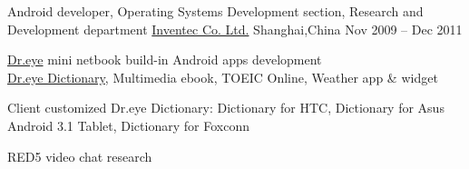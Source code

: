 \begin{cventries}
	\cventry
	{Android developer, Operating Systems Development section, Research and Development department}
	{\href{http://www.inventec.com/english/indexEN.htm}{Inventec Co. Ltd.}}
	{Shanghai,\enskip China}
	{Nov 2009 – Dec 2011}
	{
		\begin{cvitems}
			\item {\href{http://www.androidcentral.com/android-powered-dr-eye-makes-its-debut}{Dr.eye} mini netbook build-in Android apps development\\
			\href{https://play.google.com/store/apps/details?id=com.inventec.dreye.dictnew}{Dr.eye Dictionary}, Multimedia ebook, TOEIC Online, Weather app \& widget}
			\item {Client customized Dr.eye Dictionary:\enskip
			Dictionary for HTC,\enskip 
			Dictionary for Asus Android 3.1 Tablet,\enskip
			Dictionary for Foxconn}
			\item {RED5 video chat research}
		\end{cvitems}
	}
\end{cventries}

